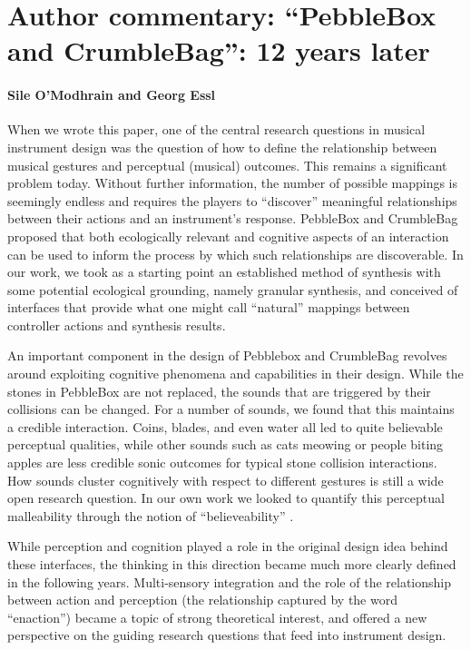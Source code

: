 \section*{Author commentary: ``PebbleBox and CrumbleBag'': 12 years later}
\paragraph{Sile O'Modhrain and Georg Essl}

When we wrote this paper, one of the central research questions in musical instrument design was the question of how to  define the relationship between musical gestures and perceptual (musical) outcomes. This remains a significant problem today. Without further information, the number of possible mappings is seemingly endless and requires the players to ``discover'' meaningful relationships between their actions and an instrument's response.  PebbleBox and CrumbleBag proposed that both ecologically relevant and cognitive aspects of an interaction can be used to inform the process by which such relationships are discoverable.  In our work, we took as a starting point an established method of synthesis with some potential ecological grounding, namely granular synthesis, and conceived of interfaces that provide what one might call ``natural'' mappings between controller actions and synthesis results. 

An important component in the design of Pebblebox and CrumbleBag revolves around exploiting cognitive phenomena and capabilities in their design. While the stones in PebbleBox are not replaced, the sounds that are triggered by their collisions can be changed. For a number of sounds, we found that this maintains a credible interaction. Coins, blades, and even water all led to quite believable perceptual qualities, while other sounds such as cats meowing or people biting apples are less credible sonic outcomes for typical stone collision interactions. How sounds cluster cognitively with respect to different gestures is still a wide open research question. In our own work we looked to quantify this perceptual malleability through the notion of ``believeability'' \cite{Essl:2005}. 

While perception and cognition played a role in the original design idea behind these interfaces, the thinking in this direction became much more clearly defined in the following years. Multi-sensory integration and the role of the relationship between action and perception (the relationship captured by the word ``enaction'') became a topic of strong theoretical interest, and offered a new perspective on the guiding research questions that feed into instrument design. 

